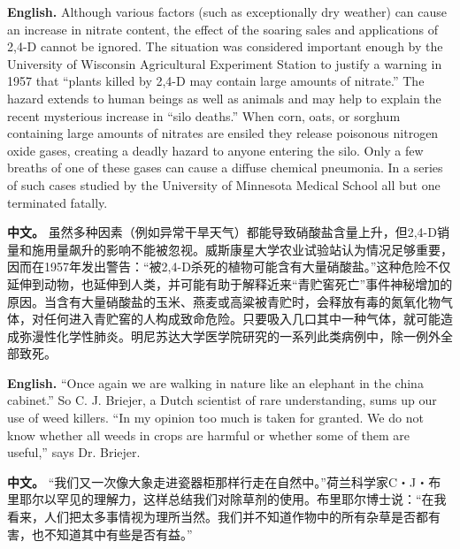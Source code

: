 \noindent\textbf{English.} Although various factors (such as exceptionally dry weather) can cause an increase in nitrate content, the effect of the soaring sales and applications of 2,4-D cannot be ignored. The situation was considered important enough by the University of Wisconsin Agricultural Experiment Station to justify a warning in 1957 that ``plants killed by 2,4-D may contain large amounts of nitrate.'' The hazard extends to human beings as well as animals and may help to explain the recent mysterious increase in ``silo deaths.'' When corn, oats, or sorghum containing large amounts of nitrates are ensiled they release poisonous nitrogen oxide gases, creating a deadly hazard to anyone entering the silo. Only a few breaths of one of these gases can cause a diffuse chemical pneumonia. In a series of such cases studied by the University of Minnesota Medical School all but one terminated fatally.
\par
\noindent\textbf{中文。} 虽然多种因素（例如异常干旱天气）都能导致硝酸盐含量上升，但2,4-D销量和施用量飙升的影响不能被忽视。威斯康星大学农业试验站认为情况足够重要，因而在1957年发出警告：“被2,4-D杀死的植物可能含有大量硝酸盐。”这种危险不仅延伸到动物，也延伸到人类，并可能有助于解释近来“青贮窖死亡”事件神秘增加的原因。当含有大量硝酸盐的玉米、燕麦或高粱被青贮时，会释放有毒的氮氧化物气体，对任何进入青贮窖的人构成致命危险。只要吸入几口其中一种气体，就可能造成弥漫性化学性肺炎。明尼苏达大学医学院研究的一系列此类病例中，除一例外全部致死。
\par\medskip

\noindent\textbf{English.} ``Once again we are walking in nature like an elephant in the china cabinet.'' So C. J. Briejer, a Dutch scientist of rare understanding, sums up our use of weed killers. ``In my opinion too much is taken for granted. We do not know whether all weeds in crops are harmful or whether some of them are useful,'' says Dr. Briejer.
\par
\noindent\textbf{中文。} “我们又一次像大象走进瓷器柜那样行走在自然中。”荷兰科学家C・J・布里耶尔以罕见的理解力，这样总结我们对除草剂的使用。布里耶尔博士说：“在我看来，人们把太多事情视为理所当然。我们并不知道作物中的所有杂草是否都有害，也不知道其中有些是否有益。”
\par\medskip

